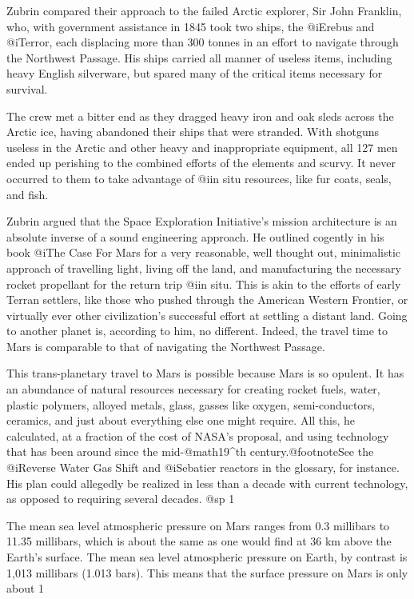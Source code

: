 Zubrin compared their approach to the failed Arctic explorer, Sir John Franklin, who, with government assistance in 1845 took two ships, the @i{Erebus} and @i{Terror}, each displacing more than 300 tonnes in an effort to navigate through the Northwest Passage. His ships carried all manner of useless items, including heavy English silverware, but spared many of the critical items necessary for survival. 

The crew met a bitter end as they dragged heavy iron and oak sleds across the Arctic ice, having abandoned their ships that were stranded. With shotguns useless in the Arctic and other heavy and inappropriate equipment, all 127 men ended up perishing to the combined efforts of the elements and scurvy. It never occurred to them to take advantage of @i{in situ} resources, like fur coats, seals, and fish.

Zubrin argued that the Space Exploration Initiative's mission architecture is an absolute inverse of a sound engineering approach. He outlined cogently in his book @i{The Case For Mars} for a very reasonable, well thought out, minimalistic approach of travelling light, living off the land, and manufacturing the necessary rocket propellant for the return trip @i{in situ}. This is akin to the efforts of early Terran settlers, like those who pushed through the American Western Frontier, or virtually ever other civilization's successful effort at settling a distant land. Going to another planet is, according to him, no different. Indeed, the travel time to Mars is comparable to that of navigating the Northwest Passage.

This trans-planetary travel to Mars is possible because Mars is so opulent. It has an abundance of natural resources necessary for creating rocket fuels, water, plastic polymers, alloyed metals, glass, gasses like oxygen, semi-conductors, ceramics, and just about everything else one might require. All this, he calculated, at a fraction of the cost of NASA's proposal, and using technology that has been around since the mid-@math{19^{th}} century.@footnote{See the @i{Reverse Water Gas Shift} and @i{Sebatier} reactors in the glossary, for instance.} His plan could allegedly be realized in less than a decade with current technology, as opposed to requiring several decades.
@sp 1


The mean sea level atmospheric pressure on Mars ranges from 0.3 millibars to 11.35 millibars, which is about the same as one would find at 36 km above the Earth's surface. The mean sea level atmospheric pressure on Earth, by contrast is 1,013 millibars (1.013 bars). This means that the surface pressure on Mars is only about 1%

